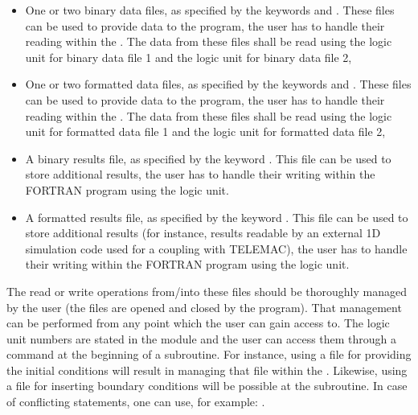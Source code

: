 \begin{itemize}
\item One or two binary data files, as specified by the keywords
 and . These files can be
used to provide data to the program, the user has to handle their reading
within the . The data from these files shall be read using
the  logic unit for binary data file 1 and the 
logic unit for binary data file 2,

\item One or two formatted data files, as specified by the keywords
 and . These files
can be used to provide data to the program, the user has to handle their
reading within the . The data from these files shall be
read using the  logic unit for formatted data file 1 and the
 logic unit for formatted data file 2,

\item A binary results file, as specified by the keyword . This file can be used to store
additional results, the user has to handle their writing within the FORTRAN
program using the  logic unit.

\item A formatted results file, as specified by the keyword . This file can be used to store additional results (for instance,
results readable by an external 1D simulation code used for a coupling with
TELEMAC), the user has to handle their writing within the FORTRAN program using
the  logic unit.
\end{itemize}

The read or write operations from/into these files should be thoroughly managed
by the user (the files are opened and closed by the program). That management
can be performed from any point which the user can gain access to.
The logic unit numbers are stated in the 
module and the user can access them through a
 command at the beginning of a
subroutine. For instance, using a file for providing the initial conditions
will result in managing that file within the .
Likewise, using a file for inserting boundary conditions will be possible at
the  subroutine. In case of conflicting statements, one can use,
for example: .

